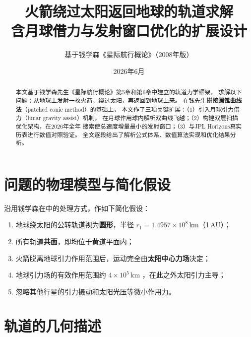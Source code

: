 \documentclass[UTF8,12pt,a4paper]{ctexart}
\title{\heiti 火箭绕过太阳返回地球的轨道求解\\[6pt]
       \large 含月球借力与发射窗口优化的扩展设计}
\author{\kaishu 基于钱学森《星际航行概论》（2008年版）}
\date{\kaishu 2026年6月}
\begin{document}
\maketitle

\begin{abstract}
\noindent 本文基于钱学森先生《星际航行概论》\cite{qian2008}第5章和第6章中建立的轨道力学框架，
求解以下问题：从地球上发射一枚火箭，绕过太阳，再返回到地球上来。
在钱先生\textbf{拼接圆锥曲线法}（patched conic method）的基础上，
本文作了三项关键扩展：（1）引入月球引力借力（lunar gravity assist）机制，
在月球作用球内解析双曲线飞越；（2）构建双层扫描优化架构，在2026年全年
搜索使总速度增量最小的发射窗口；（3）与JPL Horizons真实历表进行数值对照验证。
全文逐段给出了解析公式体系、数值算法实现和优化结果分析。
\end{abstract}

\section{问题的物理模型与简化假设}

沿用钱学森在\cite[\S6.2, pp.~118]{qian2008}中的处理方式，作如下简化假设：
\begin{enumerate}[label=(\arabic*)]
    \item 地球绕太阳的公转轨道视为\textbf{圆形}，半径 $r_1 = 1.4957 \times 10^8$\,km（1\,AU）；
    \item 所有轨道\textbf{共面}，即均位于黄道平面内；
    \item 火箭脱离地球引力作用范围后，运动完全由\textbf{太阳中心力场}决定；
    \item 地球引力场的有效作用范围约 $4 \times 10^5$\,km \cite[\S6.1, pp.~118]{qian2008}，在此之外太阳引力主导；
    \item 忽略其他行星的引力摄动和太阳光压等微小作用力。
\end{enumerate}

\section{轨道的几何描述}
\end{document}
